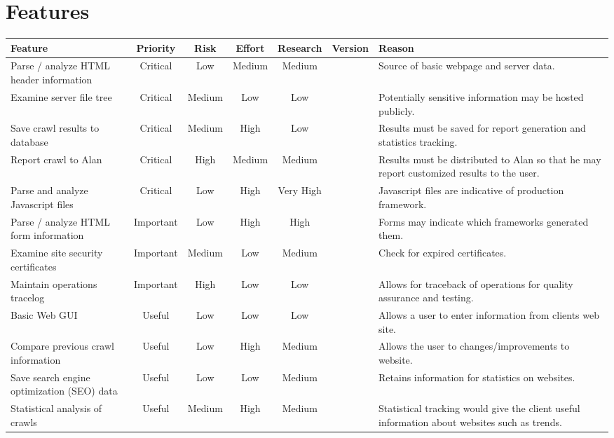 \section{Features}

\newcommand{\lw}{Low}
\newcommand{\md}{Medium}
\newcommand{\hh}{High}

\begin{tabularx}{\textwidth}{|X|c|c|c|c|c|X|}
	\hline
	\bf Feature &\bf Priority &\bf Risk &\bf Effort &\bf Research &\bf Version &\bf Reason \\ \hline
	Parse / analyze HTML header information & Critical & \lw & \md & \md &  & Source of basic webpage and server data. \\ \hline
	Examine server file tree & Critical & \md & \lw & \lw & & Potentially sensitive information may be hosted publicly. \\ \hline
	Save crawl results to database & Critical & \md & \hh & \lw & & Results must be saved for report generation and statistics tracking. \\ \hline
	Report crawl to Alan & Critical & \hh & \md & \md & & Results must be distributed to Alan so that he may report customized results to the user. \\ \hline
	Parse and analyze Javascript files & Critical & \lw & \hh & Very High & & Javascript files are indicative of production framework. \\ \hline
	Parse / analyze HTML form information & Important & \lw & \hh & \hh &  & Forms may indicate which frameworks generated them. \\ \hline
	Examine site security certificates & Important & \md & \lw & \md & & Check for expired certificates. \\ \hline
	Maintain operations tracelog & Important & \hh & \lw & \lw & & Allows for traceback of operations for quality assurance and testing. \\ \hline
	Basic Web GUI & Useful & \lw & \lw & \lw & & Allows a user to enter information from clients web site. \\ \hline
	Compare previous crawl information & Useful & \lw & \hh & \md & & Allows the user to changes/improvements to website. \\ \hline
	Save search engine optimization (SEO) data & Useful & \lw & \lw & \md & & Retains information for statistics on websites. \\ \hline
	Statistical analysis of crawls & Useful & \md & \hh & \md & & Statistical tracking would give the client useful information about websites such as trends. \\ \hline
\end{tabularx}
\newpage